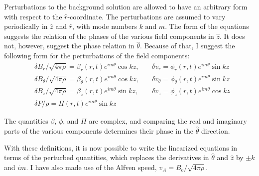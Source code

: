 \documentclass[letterpaper]{article}
\begin{document}
Perturbations to the background solution are allowed to have an arbitrary form with respect to the $\hat{r}$-coordinate.  The perturbations are assumed to vary periodically in $\hat{z}$ and $\hat{r}$, with mode numbers $k$ and $m$.  The form of the equations suggests the relation of the phases of the various field components in $\hat{z}$.  It does not, however, suggest the phase relation in $\hat{\theta}$.  Because of that, I suggest the following form for the perturbations of the field components:
\begin{align*}
&\delta B_r / \sqrt{4\pi\rho} = \beta_r (r,t)e^{im\theta}\cos{kz},\quad
&\delta v_r = \phi_r (r,t) e^{im\theta} \sin{kz}
\\
&\delta B_\theta / \sqrt{4\pi\rho} = \beta_\theta (r,t)e^{im\theta}\cos{kz},\quad
&\delta v_\theta = \phi_\theta (r,t) e^{im\theta} \sin{kz}
\\
&\delta B_z / \sqrt{4\pi\rho} = \beta_z (r,t)e^{im\theta}\sin{kz},\quad
&\delta v_z = \phi_z (r,t) e^{im\theta} \cos{kz}
\\
&\delta P / \rho = \Pi (r,t) e^{im\theta} \sin{kz}&
\end{align*}

The quantities $\beta$, $\phi$, and $\Pi$ are complex, and comparing the real and imaginary parts of the various components determines their phase in the $\hat{\theta}$ direction.

With these definitions, it is now possible to write the linearized equations in terms of the perturbed quantities, which replaces the derivatives in $\hat{\theta}$ and $\hat{z}$ by $\pm k$ and $im$.  I have also made use of the Alfven speed, $v_A = B_o / \sqrt{4\pi\rho}$.
\end{document}
